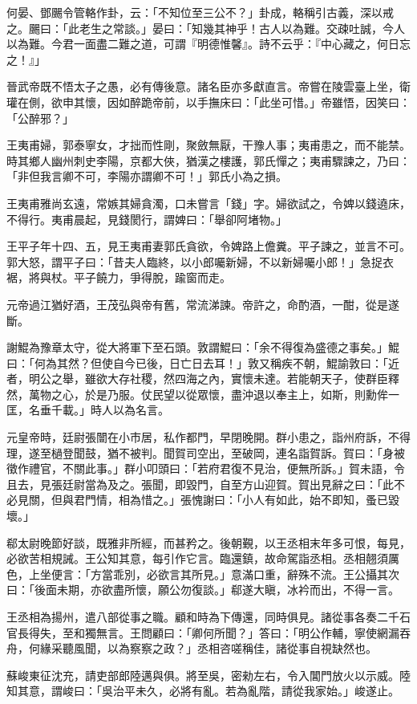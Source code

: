 何晏、鄧颺令管輅作卦，云：「不知位至三公不？」卦成，輅稱引古義，深以戒之。颺曰：「此老生之常談。」晏曰：「知幾其神乎！古人以為難。交疎吐誠，今人以為難。今君一面盡二難之道，可謂『明德惟馨』。詩不云乎：『中心藏之，何日忘之！』」

晉武帝既不悟太子之愚，必有傳後意。諸名臣亦多獻直言。帝嘗在陵雲臺上坐，衛瓘在側，欲申其懷，因如醉跪帝前，以手撫床曰：「此坐可惜。」帝雖悟，因笑曰：「公醉邪？」

王夷甫婦，郭泰寧女，才拙而性剛，聚斂無厭，干豫人事；夷甫患之，而不能禁。時其鄉人幽州刺史李陽，京都大俠，猶漢之樓護，郭氏憚之；夷甫驟諫之，乃曰：「非但我言卿不可，李陽亦謂卿不可！」郭氏小為之損。

王夷甫雅尚玄遠，常嫉其婦貪濁，口未嘗言「錢」字。婦欲試之，令婢以錢遶床，不得行。夷甫晨起，見錢閡行，謂婢曰：「舉卻阿堵物。」

王平子年十四、五，見王夷甫妻郭氏貪欲，令婢路上儋糞。平子諫之，並言不可。郭大怒，謂平子曰：「昔夫人臨終，以小郎囑新婦，不以新婦囑小郎！」急捉衣裾，將與杖。平子饒力，爭得脫，踰窗而走。

元帝過江猶好酒，王茂弘與帝有舊，常流涕諫。帝許之，命酌酒，一酣，從是遂斷。

謝鯤為豫章太守，從大將軍下至石頭。敦謂鯤曰：「余不得復為盛德之事矣。」鯤曰：「何為其然？但使自今已後，日亡日去耳！」敦又稱疾不朝，鯤諭敦曰：「近者，明公之舉，雖欲大存社稷，然四海之內，實懷未達。若能朝天子，使群臣釋然，萬物之心，於是乃服。仗民望以從眾懷，盡沖退以奉主上，如斯，則勳侔一匡，名垂千載。」時人以為名言。

元皇帝時，廷尉張闓在小市居，私作都門，早閉晚開。群小患之，詣州府訴，不得理，遂至檛登聞鼓，猶不被判。聞賀司空出，至破岡，連名詣賀訴。賀曰：「身被徵作禮官，不關此事。」群小叩頭曰：「若府君復不見治，便無所訴。」賀未語，令且去，見張廷尉當為及之。張聞，即毀門，自至方山迎賀。賀出見辭之曰：「此不必見關，但與君門情，相為惜之。」張愧謝曰：「小人有如此，始不即知，蚤已毀壞。」

郗太尉晚節好談，既雅非所經，而甚矜之。後朝覲，以王丞相末年多可恨，每見，必欲苦相規誡。王公知其意，每引作它言。臨還鎮，故命駕詣丞相。丞相翹須厲色，上坐便言：「方當乖別，必欲言其所見。」意滿口重，辭殊不流。王公攝其次曰：「後面未期，亦欲盡所懷，願公勿復談。」郗遂大瞋，冰衿而出，不得一言。

王丞相為揚州，遣八部從事之職。顧和時為下傳還，同時俱見。諸從事各奏二千石官長得失，至和獨無言。王問顧曰：「卿何所聞？」答曰：「明公作輔，寧使網漏吞舟，何緣采聽風聞，以為察察之政？」丞相咨嗟稱佳，諸從事自視缺然也。

蘇峻東征沈充，請吏部郎陸邁與俱。將至吳，密勑左右，令入閶門放火以示威。陸知其意，謂峻曰：「吳治平未久，必將有亂。若為亂階，請從我家始。」峻遂止。

